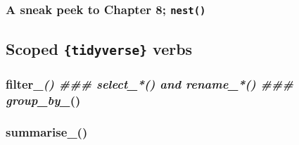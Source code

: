\documentclass[]{gitbook}
\begin{document}
\hypertarget{a-sneak-peek-to-chapter-8-nest}{%
\subsubsection{\texorpdfstring{A sneak peek to Chapter 8; \texttt{nest()}}{A sneak peek to Chapter 8; nest()}}\label{a-sneak-peek-to-chapter-8-nest}}

\hypertarget{scoped-tidyverse-verbs}{%
\subsection{\texorpdfstring{Scoped \texttt{\{tidyverse\}} verbs}{Scoped \{tidyverse\} verbs}}\label{scoped-tidyverse-verbs}}

\hypertarget{filter_-select_-and-rename_-group_by_}{%
\subsubsection{\texorpdfstring{filter\_\emph{()
\#\#\# select\_*() and rename\_*()
\#\#\# group\_by\_}()}{filter\_() \#\#\# select\_*() and rename\_*() \#\#\# group\_by\_()}}\label{filter_-select_-and-rename_-group_by_}}

\hypertarget{summarise_}{%
\subsubsection{summarise\_()}\label{summarise_}}
\end{document}
